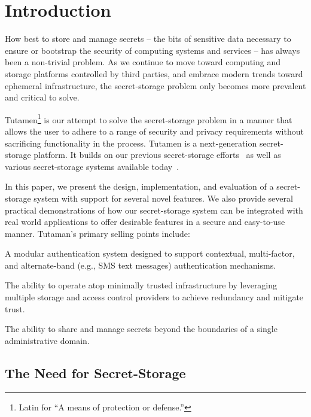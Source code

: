\section{Introduction}
\label{sec:intro}

How best to store and manage secrets -- the bits of sensitive data
necessary to ensure or bootstrap the security of computing systems and
services -- has always been a non-trivial problem. As we continue to
move toward computing and storage platforms controlled by third
parties, and embrace modern trends toward ephemeral infrastructure,
the secret-storage problem only becomes more prevalent and critical to
solve.

Tutamen\footnote{Latin for ``A means of protection or defense.''} is
our attempt to solve the secret-storage problem in a manner that
allows the user to adhere to a range of security and privacy
requirements without sacrificing functionality in the process. Tutamen
is a next-generation secret-storage platform. It builds on our
previous secret-storage efforts~\cite{custos-trios} as well as various
secret-storage systems available today~\cite{vault, confidant,
  keywhiz}.

In this paper, we present the design, implementation, and evaluation
of a secret-storage system with support for several novel features. We
also provide several practical demonstrations of how our
secret-storage system can be integrated with real world applications
to offer desirable features in a secure and easy-to-use
manner. Tutaman's primary selling points include:
\begin{packed_item}
\item A modular authentication system designed to support contextual,
  multi-factor, and alternate-band (e.g., SMS text messages)
  authentication mechanisms.
\item The ability to operate atop minimally trusted infrastructure by
  leveraging multiple storage and access control providers to achieve
  redundancy and mitigate trust.
\item The ability to share and manage secrets beyond the boundaries
  of a single administrative domain.
\end{packed_item}

\subsection{The Need for Secret-Storage}

